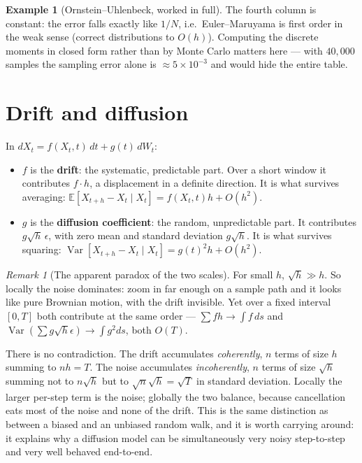 \documentclass[11pt,a4paper]{report}
\theoremstyle{definition}
\newtheorem{example}[example]{Example}
\theoremstyle{remark}
\newtheorem{remark}[remark]{Remark}
\DeclareMathOperator{\Var}{Var}
\newcommand{\EE}{\mathbb E}
\begin{document}
\begin{example}[Ornstein--Uhlenbeck, worked in full]
The fourth column is constant: the error falls exactly like $1/N$, i.e.\
Euler--Maruyama is first order in the weak sense (correct distributions to
$O(h)$). Computing the discrete moments in closed form rather than by Monte
Carlo matters here --- with $40{,}000$ samples the sampling error alone is
$\approx5\times10^{-3}$ and would hide the entire table.
\end{example}

\section{Drift and diffusion}
\label{sec:sde-drift-diffusion}

In $dX_t = f(X_t,t)\,dt + g(t)\,dW_t$:
\begin{itemize}
\item $f$ is the \textbf{drift}: the systematic, predictable part. Over a
      short window it contributes $f\cdot h$, a displacement in a definite
      direction. It is what survives averaging: $\EE[X_{t+h}-X_t\mid X_t]
      = f(X_t,t)h+O(h^2)$.
\item $g$ is the \textbf{diffusion coefficient}: the random, unpredictable
      part. It contributes $g\sqrt h\,\epsilon$, with zero mean and standard
      deviation $g\sqrt h$. It is what survives squaring:
      $\Var[X_{t+h}-X_t\mid X_t]=g(t)^2h+O(h^2)$.
\end{itemize}

\begin{remark}[The apparent paradox of the two scales]
\label{rem:sde-two-scales}
For small $h$, $\sqrt h\gg h$. So locally the noise dominates: zoom in far
enough on a sample path and it looks like pure Brownian motion, with the
drift invisible. Yet over a fixed interval $[0,T]$ both contribute at the
same order --- $\sum f h\to\int f\,ds$ and $\Var(\sum g\sqrt h\epsilon)\to
\int g^2ds$, both $O(T)$.

There is no contradiction. The drift accumulates \emph{coherently}, $n$
terms of size $h$ summing to $nh=T$. The noise accumulates
\emph{incoherently}, $n$ terms of size $\sqrt h$ summing not to $n\sqrt h$
but to $\sqrt n\sqrt h=\sqrt T$ in standard deviation. Locally the larger
per-step term is the noise; globally the two balance, because cancellation
eats most of the noise and none of the drift. This is the same distinction
as between a biased and an unbiased random walk, and it is worth carrying
around: it explains why a diffusion model can be simultaneously very noisy
step-to-step and very well behaved end-to-end.
\end{remark}
\end{document}
